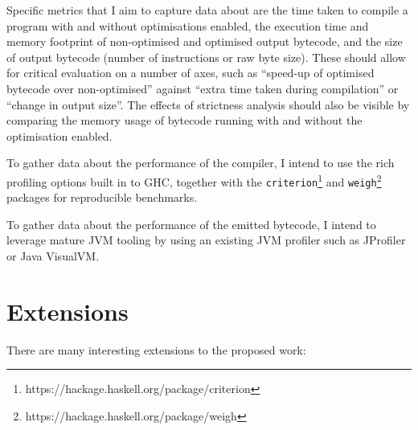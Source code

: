 \documentclass[12pt]{article}
\newcommand\monospace[1]{\texttt{#1}}
\begin{document}
Specific metrics that I aim to capture data about are the time taken to compile a program with and without optimisations
enabled, the execution time and memory footprint of non-optimised and optimised output bytecode, and the size of output
bytecode (number of instructions or raw byte size). These should allow for critical evaluation on a number of axes, such
as ``speed-up of optimised bytecode over non-optimised'' against ``extra time taken during compilation'' or ``change in
output size''. The effects of strictness analysis should also be visible by comparing the memory usage of bytecode
running with and without the optimisation enabled.

To gather data about the performance of the compiler, I intend to use the rich profiling options built in to GHC,
together with the \monospace{criterion}\footnote{https://hackage.haskell.org/package/criterion} and
\monospace{weigh}\footnote{https://hackage.haskell.org/package/weigh} packages for reproducible benchmarks.

To gather data about the performance of the emitted bytecode, I intend to leverage mature JVM tooling by using an
existing JVM profiler such as JProfiler or Java VisualVM.

\section*{Extensions}

There are many interesting extensions to the proposed work:
\end{document}

